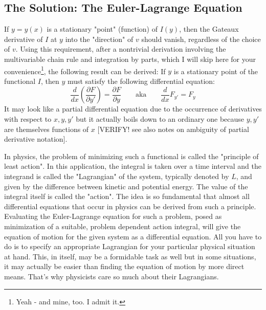 

\subsection{The Solution: The Euler-Lagrange Equation}
If $y = y(x)$ is a stationary "point" (function) of $I(y)$, then the Gateaux derivative of $I$ at $y$ into the "direction" of $v$ should vanish, regardless of the choice of $v$. Using this requirement, after a nontrivial derivation involving the multivariable chain rule and integration by parts, which I will skip here for your convenience\footnote{Yeah - and mine, too. I admit it.}, the following result can be derived: If $y$ is a stationary point of the functional $I$, then $y$ must satisfy the following differential equation:
\begin{equation}
 \frac{d}{d x} \left(  \frac{\partial F}{\partial y'}  \right) = \frac{\partial F}{\partial y}
 \qquad \text{aka} \qquad
 \frac{d}{d x} F_{y'} = F_{y}
\end{equation}
It may look like a partial differential equation due to the occurrence of derivatives with respect to $x,y,y'$ but it actually boils down to an ordinary one because $y,y'$ are themselves functions of $x$ [VERIFY! see also notes on ambiguity of partial derivative notation].

\medskip
In physics, the problem of minimizing such a functional is called the "principle of least action". In this application, the integral is taken over a time interval and the integrand is called the "Lagrangian" of the system, typically denoted by $L$, and given by the difference between kinetic and potential energy. The value of the integral itself is called the "action". The idea is so fundamental that almost all differential equations that occur in physics can be derived from such a principle. Evaluating the Euler-Lagrange equation for such a problem, posed as minimization of a suitable, problem dependent action integral, will give the equation of motion for the given system as a differential equation. All you have to do is to specify an appropriate Lagrangian for your particular physical situation at hand. This, in itself, may be a formidable task as well but in some situations, it may actually be easier than finding the equation of motion by more direct means. That's why physicists care so much about their Lagrangians.



